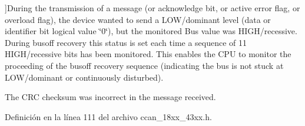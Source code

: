 \begin{Desc}
\begin{description}
{}]During the transmission of a message (or acknowledge bit, or active error flag, or overload flag), the device wanted to send a L\+O\+W/dominant level (data or identifier bit logical value \char`\"{}0\char`\"{}), but the monitored Bus value was H\+I\+G\+H/recessive. During busoff recovery this status is set each time a sequence of 11 H\+I\+G\+H/recessive bits has been monitored. This enables the C\+PU to monitor the proceeding of the busoff recovery sequence (indicating the bus is not stuck at L\+O\+W/dominant or continuously disturbed). \item[{\em 
C\+C\+A\+N\+\_\+\+L\+E\+C\+\_\+\+C\+R\+C\+\_\+\+E\+R\+R\+OR\hypertarget{group___c_c_a_n__18_x_x__43_x_x_ggad7a3e9e736dfb04f5faff4954a01591aa9b75109a2824295f6739961e1b110367}{}\label{group___c_c_a_n__18_x_x__43_x_x_ggad7a3e9e736dfb04f5faff4954a01591aa9b75109a2824295f6739961e1b110367}
}]The C\+RC checksum was incorrect in the message received. \end{description}
\end{Desc}


Definición en la línea 111 del archivo ccan\+\_\+18xx\+\_\+43xx.\+h.

